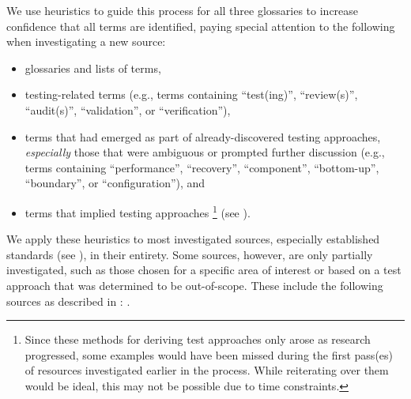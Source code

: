 We use heuristics to guide this process for all three
glossaries to increase confidence that all terms are identified, paying
special attention to the following when investigating a new source:
\begin{itemize}
    \item glossaries and lists of terms,
    \item testing-related terms (e.g., terms containing ``test(ing)'',
          \ifnotpaper ``review(s)'', ``audit(s)'', \fi
          ``validation'', or ``verification''),
    \item terms that had emerged as part of already-discovered
          testing approaches, \emph{especially} those that were ambiguous
          or prompted further discussion (e.g., terms containing
          ``performance'', ``recovery'', ``component'', ``bottom-up'',
          \ifnotpaper ``boundary'', \fi or ``configuration''), and
    \item terms that implied testing approaches%
          \ifnotpaper\footnote{
                  Since these methods for deriving test approaches only arose
                  as research progressed, some examples would have been missed
                  during the first pass(es) of resources investigated earlier
                  in the process. While reiterating over them would be ideal,
                  this may not be possible due to time constraints.
              } (see )\fi.
\end{itemize}
We apply these heuristics to most investigated sources, especially established
standards (see ), in their entirety. Some sources, however, are only
partially investigated, such as those chosen for a specific area of
interest or based on a test approach that was determined to be out-of-scope.
These include the following sources as described in :
\citep{ISO2022,ISO2015,Dominguez-PumarEtAl2020,PierreEtAl2017,
    TrudnowskiEtAl2017,YuEtAl2011,Tsui2007,Goralski1999}.

